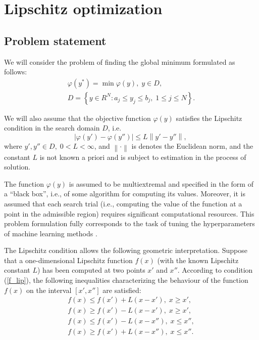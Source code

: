 \documentclass[iicol]{sn-jnl}
\theoremstyle{thmstyleone}%
\theoremstyle{thmstyletwo}%
\theoremstyle{thmstylethree}%
\begin{document}
\section{Lipschitz optimization}\label{sec_lip}

\subsection{Problem statement} 

We will consider the problem of finding the global minimum formulated as follows:
\begin{gather}
	\varphi(y^*) = \min \varphi(y), \; y \in D, \label{f_func} \\
	D = \left\{y \in R^N : a_j \leq y_j \leq b_j , \; 1 \leq j \leq N \right\}. \label{f_D}
\end{gather}

We will also assume that the objective function $\varphi(y)$ satisfies the Lipschitz condition in the search domain $D$, i.e.
\begin{equation} \label{f_lip}
	\left| \varphi(y')-\varphi(y'') \right| \leq L\left\| y' - y''  \right\| , \,
\end{equation}
where $y',y'' \in D, \; 0<L<\infty$, and $ \left\| \cdot \right\|$ is denotes the Euclidean norm, and the constant $L$ is not known a priori and is subject to estimation in the process of solution. 

The function $\varphi(y)$ is assumed to be multiextremal and specified in the form of a ``black box'', i.e., of some algorithm for computing its values. Moreover, it is assumed that each search trial (i.e., computing the value of the function at a point in the admissible region) requires significant computational resources. This problem formulation fully corresponds to the task of tuning the hyperparameters of machine learning methods \citep{Joy2020,Wang2021}.

The Lipschitz condition allows the following geometric interpretation. Suppose that a one-dimensional Lipschitz function $f(x)$ (with the known Lipschitz constant $L$) has been computed at two points $x'$ and $x''$. According to condition (\ref{f_lip}), the following inequalities characterizing the behaviour of the function $f(x)$ on the interval $[x', x'']$  are satisfied:
\begin{gather*}
	f(x) \leq f(x') + L(x-x'), \; x \geq x',\\
	f(x) \geq f(x') - L(x-x'), \; x \geq x',\\
	f(x) \leq f(x') - L(x-x''), \; x \leq x'',\\
	f(x) \geq f(x') + L(x-x''), \; x \leq x''.
\end{gather*}
\end{document}

